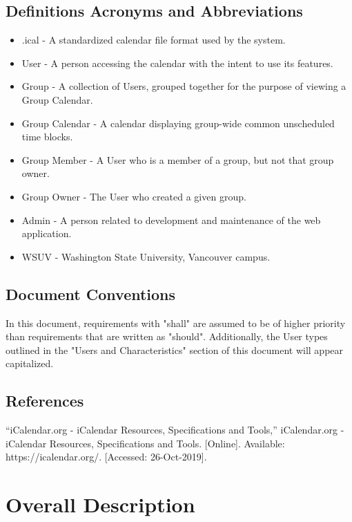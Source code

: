 \documentclass{scrreprt}
\begin{document}
\section{Definitions Acronyms and Abbreviations}
\begin{itemize}
\item .ical - A standardized calendar file format used by the system.
\item User - A person accessing the calendar with the intent to use its
features.
\item Group - A collection of Users, grouped together for the purpose of viewing
a Group Calendar.
\item Group Calendar - A calendar displaying group-wide common unscheduled time blocks.
\item Group Member - A User who is a member of a group, but not that group owner.
\item Group Owner - The User who created a given group.
\item Admin - A person related to development and maintenance of the web application.
\item WSUV - Washington State University, Vancouver campus.
\end{itemize}

\section{Document Conventions}
In this document, requirements with "shall" are assumed to be of higher priority than
requirements that are written as "should". Additionally, the User types outlined in
the "Users and Characteristics" section of this document will appear capitalized.


\section{References}
“iCalendar.org - iCalendar Resources, Specifications and Tools,” iCalendar.org - iCalendar Resources, Specifications and Tools. [Online]. Available: https://icalendar.org/. [Accessed: 26-Oct-2019].


\chapter{Overall Description}
\end{document}
